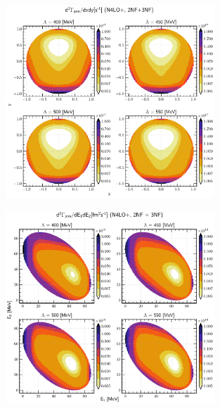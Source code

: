     \begin{figure}[h]
        \begin{center}
        \includegraphics[width=0.7\textwidth]{PlotData/PION/Dalitz_maps/figures/Dalitz_map_pnn_xy_cutofs.pdf}
        \end{center}
        \caption{}
        \label{pion_map_xy_cutoff}
    \end{figure}

    \begin{figure}[h]
        \begin{center}
        \includegraphics[width=0.7\textwidth]{PlotData/PION/Dalitz_maps/figures/Dalitz_map_pnn_E1E2_cutofs.pdf}
        \end{center}
        \caption{}
        \label{pion_map_E1E2_cutoff}
    \end{figure}

